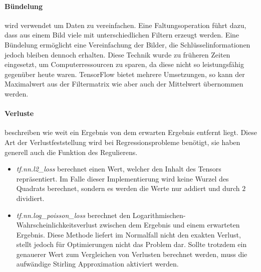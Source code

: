 \paragraph{Bündelung} wird verwendet um Daten zu vereinfachen. 
Eine Faltungsoperation führt dazu, dass aus einem Bild viele mit unterschiedlichen Filtern erzeugt werden.
Eine Bündelung ermöglicht eine Vereinfachung der Bilder, die Schlüsselinformationen jedoch bleiben dennoch erhalten. 
Diese Technik wurde zu früheren Zeiten eingesetzt, um Computerressourcen zu sparen, da diese nicht so leistungsfähig gegenüber heute waren. 
TensorFlow bietet mehrere Umsetzungen, so kann der Maximalwert aus der Filtermatrix wie aber auch der Mittelwert übernommen werden. 

\paragraph{Verluste} beschreiben wie weit ein Ergebnis von dem erwarten Ergebnis entfernt liegt. 
Diese Art der Verlustfeststellung wird bei Regressionsprobleme benötigt, sie haben generell auch die Funktion des Regulierens.
\begin{itemize}
	\item \textit{tf.nn.l2\_loss} berechnet einen Wert, welcher den Inhalt des Tensors repräsentiert. 
	Im Falle dieser Implementierung wird keine Wurzel des Quadrats berechnet, sondern es werden die Werte nur addiert und durch $2$ dividiert.
	\item \textit{tf.nn.log\_poisson\_loss} berechnet den Logarithmischen-Wahrscheinlichkeitsverlust zwischen dem Ergebnis und einem erwarteten Ergebnis. 
	Diese Methode liefert im Normalfall nicht den exakten Verlust, stellt jedoch für Optimierungen nicht das Problem dar. 
	Sollte trotzdem ein genauerer Wert zum Vergleichen von Verlusten berechnet werden, muss die aufwändige Stirling Approximation \cite{feller1968introduction} aktiviert werden. 
\end{itemize}

